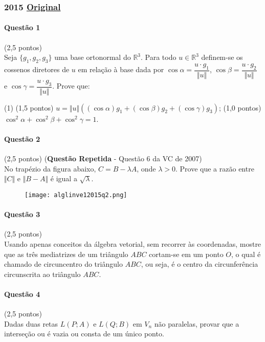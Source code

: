 \documentclass[12pt,a4paper]{article}
\newcommand{\R}{\mathbb{R}}
\newcommand{\norm}[1]{\Vert #1 \Vert}
\newcommand{\original}[1]{\tiny \href{#1}{Original} \normalsize}
\begin{document}
\newpage

\subsubsection{2015 \original{https://drive.google.com/file/d/1Y3kN_HtBe9hokdZkmQhndYtwYu_B7tkT/view?usp=sharing}}

\paragraph{Questão 1} (2,5 pontos)\\
Seja $\{g_1, g_2, g_3\}$ uma base ortonormal do $\R^3$. Para todo $u\in \R ^3$ definem-se os cossenos diretores de $u$ em relação à base dada por $\cos \alpha = \dfrac{u\cdot g_1}{\norm{u}}$, $\cos \beta = \dfrac{u\cdot g_2}{\norm{u}}$ e $\cos \gamma = \dfrac{u\cdot g_3}{\norm{u}}$. Prove que:
\begin{tasks}(1)
\task (1,5 pontos) $u = \norm{u}\left( (\cos \alpha)g_1 + (\cos \beta)g_2 + (\cos \gamma)g_3 \right)$;
\task (1,0 pontos) $\cos^2 \alpha + \cos ^2 \beta + \cos ^2 \gamma = 1$.
\end{tasks}

\paragraph{Questão 2} (2,5 pontos) (\textbf{Questão Repetida} - Questão 6 da VC de 2007) \\
No trapézio da figura abaixo, $C = B-\lambda A$, onde $\lambda > 0$. Prove que a razão entre $\norm{C}$ e $\norm{B-A}$ é igual a $\sqrt{\lambda}$.

\begin{figure}[h]
\centering
\texttt{[image: alglinve12015q2.png]}
\end{figure}

\paragraph{Questão 3} (2,5 pontos)\\
Usando apenas conceitos da álgebra vetorial, sem recorrer às coordenadas, mostre que as três mediatrizes de um triângulo $ABC$ cortam-se em um ponto $O$, o qual é chamado de circuncentro do triângulo $ABC$, ou seja, é o centro da circunferência circunscrita ao triângulo $ABC$.

\paragraph{Questão 4} (2,5 pontos)\\
Dadas duas retas $L(P;A)$ e $L(Q;B)$ em $V_n$ não paralelas, provar que a interseção ou é vazia ou consta de um único ponto.
\end{document}
